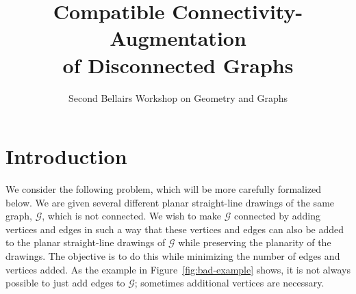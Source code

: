 \documentclass[a4paper, 11pt]{article}
\begin{document}
\title{Compatible Connectivity-Augmentation \\ of Disconnected Graphs}





\author{Second Bellairs Workshop on Geometry and Graphs}
\date{}

\maketitle
\begin{abstract}

\end{abstract}



\section{Introduction}


We consider the following problem, which will be more carefully formalized
below.  We are given several different planar straight-line drawings
of the same graph, $\mathcal G$, which is not connected.
We wish to make $\mathcal G$ connected by adding vertices and edges in
such a way that these vertices and edges can also be added to the planar
straight-line drawings of $\mathcal G$ while preserving the planarity of
the drawings.  The objective is to do this while minimizing the number
of edges and vertices added.  As the example in Figure~\ref{fig:bad-example} shows, it is not always possible to just add edges to $\mathcal G$; sometimes additional vertices are necessary.
\end{document}
